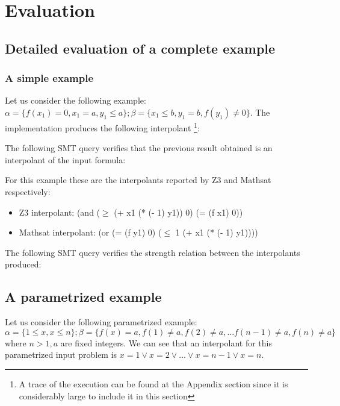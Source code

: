 \section{Evaluation}

\subsection{Detailed evaluation of a complete example}

\subsubsection{A simple example}

Let us consider the following example: 
$\alpha = \{ f(x_1) = 0, x_1 = a, y_1 \leq a\}; 
\beta = \{x_1 \leq b, y_1 = b, f(y_1) \neq 0\}$.
The implementation produces the following interpolant \footnote{A trace of the
execution can be found at the Appendix section since it is considerably
large to include it in this section}: 



The following SMT query verifies that the previous result obtained is 
an interpolant of the input formula:



For this example these are the interpolants reported by Z3 and Mathsat
respectively:

\begin{itemize}
\item Z3 interpolant: (and ($\geq$ (+ x1 (* (- 1) y1)) 0) (= (f x1) 0))
\item Mathsat interpolant: (or (= (f y1) 0) ($\leq$ 1 (+ x1 (* (- 1) y1))))
\end{itemize}

The following SMT query verifies the strength relation between the interpolants produced:




\subsection{A parametrized example}

Let us consider the following parametrized 
example: $\alpha = \{1 \leq x, x \leq n \}; \beta = \{f(x) = a, 
f(1) \neq a,
f(2) \neq a, \dots
f(n-1) \neq a,
f(n) \neq a\}$ where $n > 1, a$ are fixed integers. We can see that an 
interpolant for this parametrized input problem is 
$x = 1 \lor x = 2 \lor \dots \lor x = n-1 \lor x = n$.

